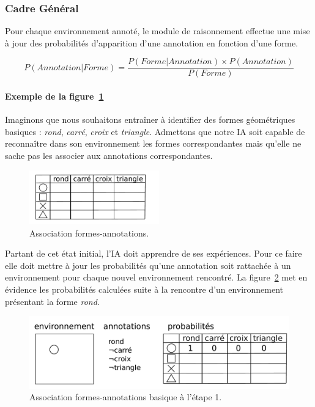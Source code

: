 \subsubsection{Cadre Général}

Pour chaque environnement annoté, le module de raisonnement effectue une mise à jour des probabilités d'apparition d'une annotation en fonction d'une forme.

\[ P(Annotation|Forme) = \frac{P(Forme|Annotation) \times P(Annotation)}{P(Forme)} \]

\paragraph{Exemple de la figure~\ref{img_annotations}}
Imaginons que nous souhaitons entraîner \cogito{} à identifier des formes géométriques basiques : \emph{rond}, \emph{carré}, \emph{croix} et \emph{triangle}. Admettons que notre IA soit capable de reconnaître dans son environnement les formes correspondantes mais qu'elle ne sache pas les associer aux annotations correspondantes.

\begin{figure}[H] 
\centering
    \includegraphics[width=0.5\textwidth]{files/raisonneur/annotations} 
\caption{Association formes-annotations.} 
\label{img_annotations}
\end{figure}

Partant de cet état initial, l'IA doit apprendre de ses expériences. Pour ce faire elle doit mettre à jour les probabilités qu'une annotation soit rattachée à un environnement pour chaque nouvel environnement rencontré. La figure~\ref{img_annotations_1} met en évidence les probabilités calculées suite à la rencontre d'un environnement présentant la forme \emph{rond}.

\begin{figure}[H] 
\centering
\includegraphics[width=\textwidth]{files/raisonneur/annotations_1} 
\caption{Association formes-annotations basique à l'étape 1.} 
\label{img_annotations_1}
\end{figure}

